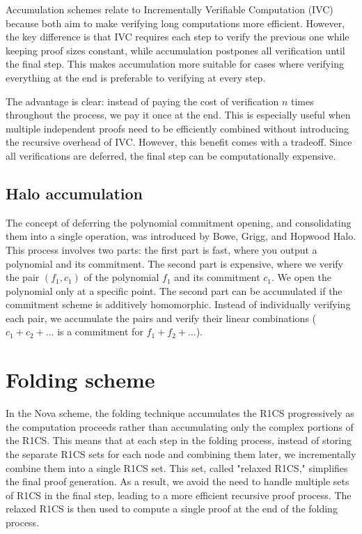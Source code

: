 Accumulation schemes relate to Incrementally Verifiable Computation (IVC) because both aim to make verifying long computations more efficient. 
However, the key difference is that IVC requires each step to verify the previous one while keeping proof sizes constant, while accumulation postpones all verification until the final step. 
This makes accumulation more suitable for cases where verifying everything at the end is preferable to verifying at every step.

The advantage is clear: instead of paying the cost of verification $n$ times throughout the process, we pay it once at the end. 
This is especially useful when multiple independent proofs need to be efficiently combined without introducing the recursive overhead of IVC. 
However, this benefit comes with a tradeoff. Since all verifications are deferred, the final step can be computationally expensive.\cite{BB20}


\subsection{Halo accumulation}
The concept of deferring the polynomial commitment opening, and consolidating them into a single operation, was introduced by Bowe, Grigg, and Hopwood Halo.\cite{BGH23}
This process involves two parts:
the first part is fast, where you output a polynomial and its commitment.
The second part is expensive, where we verify the pair $(f_1, c_1)$ of the polynomial $f_1$ and its commitment $c_1$. We open the polynomial only at a specific point.
The second part can be accumulated if the commitment scheme is additively homomorphic. 
Instead of individually verifying each pair, we accumulate the pairs and verify their linear combinations ($c_1+c_2+...$ is a commitment for $f_1+f_2+...$). \cite{VR23}


\section{Folding scheme}
In the Nova scheme, the folding technique accumulates the R1CS progressively as the computation proceeds rather than accumulating only the complex portions of the R1CS. 
This means that at each step in the folding process, instead of storing the separate R1CS sets for each node and combining them later, we incrementally combine them into a single R1CS set. 
This set, called "relaxed R1CS," simplifies the final proof generation.
As a result, we avoid the need to handle multiple sets of R1CS in the final step, leading to a more efficient recursive proof process. 
The relaxed R1CS is then used to compute a single proof at the end of the folding process.
\cite{Nova23}  \cite{ASI23} \cite{vODC24F}

